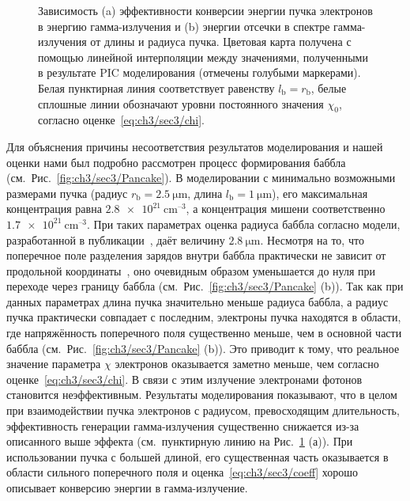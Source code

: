 \begin{figure}[ht]
    \caption[Зависимость эффективности конверсии энергии пучка электронов в энергию гамма-излучения и энергии отсечки в спектре гамма-излучения от длины и радиуса пучка]{Зависимость (a) эффективности конверсии энергии пучка электронов в энергию гамма-излучения и (b) энергии отсечки в спектре гамма-излучения от длины и радиуса пучка.
    Цветовая карта получена с помощью линейной интерполяции между значениями, полученными в результате PIC моделирования (отмечены голубыми маркерами).
    Белая пунктирная линия соответствует равенству $l_\mathrm{b} = r_\mathrm{b}$, белые сплошные линии обозначают уровни постоянного значения $\chi_0$, согласно оценке~\eqref{eq:ch3/sec3/chi}.}
    \label{fig:ch3/sec3/Efficiency}
\end{figure}

Для объяснения причины несоответствия результатов моделирования и нашей оценки нами был подробно рассмотрен процесс формирования баббла (см.~Рис.~\ref{fig:ch3/sec3/Pancake}).
В моделировании с минимально возможными размерами пучка (радиус $r_\mathrm{b} = \SI{2.5}{\um}$, длина $l_\mathrm{b} = \SI{1}{\um}$), его максимальная концентрация равна $\SI{2.8e21}{\centi\meter^{–3}}$, а концентрация мишени соответственно $\SI{1.7e21}{\centi\meter^{–3}}$.
При таких параметрах оценка радиуса баббла согласно модели, разработанной в публикации~\cite{golovanov2021excitation}, даёт величину $\SI{2.8}{\um}$.
Несмотря на то, что поперечное поле разделения зарядов внутри баббла практически не зависит от продольной координаты~\cite{kostyukov2004phenomenological}, оно очевидным образом уменьшается до нуля при переходе через границу баббла (см.~Рис.~\ref{fig:ch3/sec3/Pancake} (b)).
Так как при данных параметрах длина пучка значительно меньше радиуса баббла, а радиус пучка практически совпадает с последним, электроны пучка находятся в области, где напряжённость поперечного поля существенно меньше, чем в основной части баббла (см.~Рис.~\ref{fig:ch3/sec3/Pancake} (b)).
Это приводит к тому, что реальное значение параметра $\chi$ электронов оказывается заметно меньше, чем согласно оценке~\eqref{eq:ch3/sec3/chi}.
В связи с этим излучение электронами фотонов становится неэффективным.
Результаты моделирования показывают, что в целом при взаимодействии пучка электронов с радиусом, превосходящим длительность, эффективность генерации гамма-излучения существенно снижается из-за описанного выше эффекта (см.~пунктирную линию на Рис.~\ref{fig:ch3/sec3/Efficiency} (а)).
При использовании пучка с большей длиной, его существенная часть оказывается в области сильного поперечного поля и оценка~\eqref{eq:ch3/sec3/coeff} хорошо описывает конверсию энергии в гамма-излучение. 

